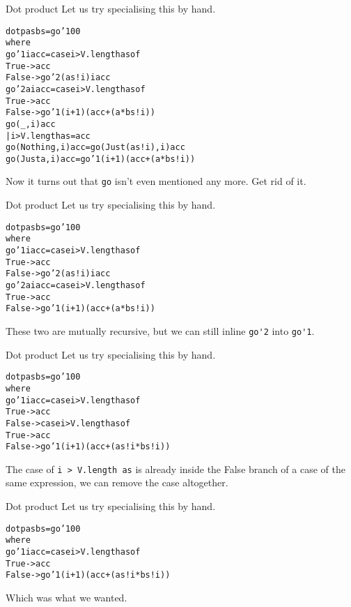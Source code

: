 \documentclass[t]{beamer}
\newcommand{\oomph}[1]{\textcolor[rgb]{0.0,0.5,0.9}{#1}}
\begin{document}
\begin{frame}[fragile]{Dot product}
Let us try specialising this by hand.
\begin{alltt}
dotp as bs = go'1 0 0
 where
  go'1 i acc = case i > V.length as of
   True  -> acc
   False -> go'2 (as!i) i acc
  go'2 a i acc = case i > V.length as of
   True  -> acc
   False -> go'1 (i + 1) (acc + (a * bs!i))
  \oomph{go (_, i) acc
   | i > V.length as  = acc
  go (Nothing, i) acc = go (Just (as!i), i) acc
  go (Just a,  i) acc = go'1 (i + 1) (acc + (a * bs!i))}
\end{alltt}
Now it turns out that \verb/go/ isn't even mentioned any more. Get rid of it.
\end{frame}

\begin{frame}[fragile]{Dot product}
Let us try specialising this by hand.
\begin{alltt}
dotp as bs = go'1 0 0
 where
  go'1 i acc = case i > V.length as of
   True  -> acc
   False -> \oomph{go'2 (as!i) i acc}
  go'2 a i acc = case i > V.length as of
   True  -> acc
   False -> \oomph{go'1 (i + 1) (acc + (a * bs!i))}




\end{alltt}
These two are mutually recursive, but we can still inline \verb/go'2/ into \verb/go'1/.
\end{frame}

\begin{frame}[fragile]{Dot product}
Let us try specialising this by hand.
\begin{alltt}
dotp as bs = go'1 0 0
 where
  go'1 i acc = \oomph{case i > V.length as of}
   True  -> acc
   \oomph{False -> case i > V.length as of}
      True  -> acc
      \oomph{False ->} go'1 (i + 1) (acc + (as!i * bs!i))





\end{alltt}
The case of \verb/i > V.length as/ is already inside the False branch of a case of the same expression,
we can remove the case altogether.
\end{frame}

\begin{frame}[fragile]{Dot product}
Let us try specialising this by hand.
\begin{alltt}
dotp as bs = go'1 0 0
 where
  go'1 i acc = case i > V.length as of
   True  -> acc
   False -> \oomph{go'1 (i + 1) (acc + (as!i * bs!i))}







\end{alltt}
Which was what we wanted.
\end{frame}
\end{document}
